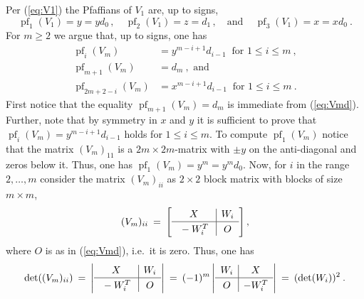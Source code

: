 \documentclass{amsart}
\theoremstyle{bfupright head,upright body}
\theoremstyle{fixed bf head,slanted body}
\theoremstyle{fixed bf head,upright body}
\theoremstyle{numbered paragraph}
\newenvironment{prf*}[1][Proof]{%
  \begin{proof}[\bf #1]
    \setcounter{equation}{0}
    \renewcommand{\theequation}{\arabic{equation}}}
  {\end{proof}
}
\renewcommand{\eqref}[1]{\pgref{eq:#1}}
\newcommand{\pgref}[1]{(\ref{#1})}
\newcommand{\qtext}[1]{\quad\text{#1}\quad}
\newcommand{\qand}{\qtext{and}}
\newcommand{\deq}{\:=\:}
\newcommand{\pf}[2]{\operatorname{pf}_{#1}(#2)}
\numberwithin{equation}{res}
\begin{document}
\begin{prf*}
  Per \eqref{V1} the Pfaffians of $V_1$ are, up to signs,
  \begin{equation*}
    \pf{1}{V_1} = y = yd_0\,, 
    \quad \pf{2}{V_1} = z = d_1\,,\qand\,\pf{3}{V_1} = x =
    xd_0\:.
  \end{equation*}
  For $m \ge 2$ we argue that, up to signs, one has
  \begin{align*}
    \pf{i}{V_m} &= y^{m-i+1}d_{i-1} \ \text{ for } 1\le i \le m\:,\\
    \pf{m+1}{V_m} &= d_m\:,\text{ and}\\
    \pf{2m+2-i}{V_m} &= x^{m-i+1}d_{i-1} \ \text{ for } 1\le i \le m\:.
  \end{align*}
  First notice that the equality $\pf{m+1}{V_m} = d_m$ is immediate
  from \eqref{Vmd}. Further, note that by symmetry in $x$ and $y$ it
  is sufficient to prove that $\pf{i}{V_m} = y^{m-i+1}d_{i-1}$ holds
  for $1\le i \le m$. To compute $\pf{1}{V_m}$ notice that the matrix
  $(V_m)_{11}$ is a $2m\times 2m$-matrix with $\pm y$ on the
  anti-diagonal and zeros below it. Thus, one has $\pf{1}{V_m} = y^m =
  y^md_0$. Now, for $i$ in the range $2,\ldots,m$ consider the matrix
  $(V_m)_{ii}$ as $2\times 2$ block matrix with blocks of size
  $m\times m$,
  \begin{equation*}
    (V_{m})_{ii} \deq \left[
      \begin{array}[c]{c|c}
        X & W_{i}\\[1pt]
        \hline
        \phantom{\raisebox{3pt}{$|$}}-W_i^T\phantom{\raisebox{3pt}{$|$}} & O
      \end{array}
    \right],
  \end{equation*}
  where $O$ is as in \eqref{Vmd}, i.e.\ it is zero. Thus, one has
  \begin{equation*}
    \det((V_{m})_{ii}) \deq 
    \left|
      \begin{array}[c]{c|c}
        X & W_{i}\\[1pt]
        \hline
        \phantom{\raisebox{3pt}{$|$}}-W_i^T\phantom{\raisebox{3pt}{$|$}} & O
      \end{array}
    \right| 
    \deq
    (-1)^m\left|
      \begin{array}[c]{c|c}
        W_i & X\\[1pt]
        \hline
        \phantom{\raisebox{3pt}{$|$}}O\phantom{\raisebox{3pt}{$|$}} & -W_i^T
      \end{array}
    \right| 
    \deq (\det (W_i))^2\:.
  \end{equation*}

\end{prf*}
\end{document}
